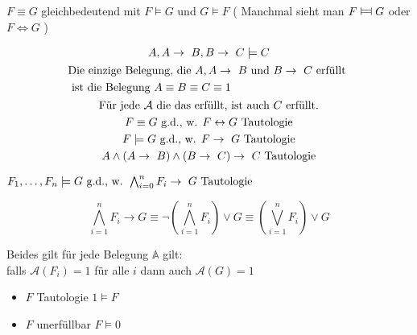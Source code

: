 \begin{bem}
		$F \equiv G$ gleichbedeutend mit $F \models G$ und $G \models F$ ( Manchmal sieht man $ F \vDash\joinrel\Dashv G$ oder $F \iff G$ )
\end{bem}
\begin{bsp*}
		\begin{gather*}
		A , A \rightarrow B , B \rightarrow C \models C\\
		\begin{split}
			& \text{Die einzige Belegung, die } A , A \rightarrow B \text{ und } B \rightarrow C \text{ erfüllt  } \\
			& \text{ ist die Belegung } A \equiv B \equiv C \equiv 1 \\
		\end{split}\\
		\text{Für jede } \mathcal{A} \text{ die das erfüllt, ist auch } C \text{ erfüllt.} \\
		F \equiv G \text{ \gdw } F \leftrightarrow G \text{ Tautologie} \\
		F \models G \text{ \gdw } F \rightarrow G \text{ Tautologie} \\
		A \wedge ( A \rightarrow B ) \wedge ( B \rightarrow C ) \rightarrow C \text{ Tautologie}
	\end{gather*}
\end{bsp*}
\begin{satz*}
	$F_1 , \dotsc , F_n \models G \text{ \gdw } \bigwedge_{i=0}^n F_i \rightarrow G \text{ Tautologie}$\\
	\begin{bew}
		\[\bigwedge_{i=1}^n F_i \rightarrow G \equiv \neg ( \bigwedge_{i=1}^n F_i  ) \vee G \equiv ( \bigvee_{i=1}^n F_i  ) \vee G\]
	\end{bew}
	Beides gilt \gdw für jede Belegung $\mathbb{A}$ gilt:\\
	\qquad falls $\mathcal{A}( F_i ) = 1$ für alle $i$ dann auch $\mathcal{A}( G ) = 1$
\end{satz*}
\begin{bem}
	\begin{itemize}
		\item $F$ Tautologie \gdw $1 \models F$
		\item $F$ unerfüllbar \gdw $F \models 0$
	\end{itemize}
\end{bem}

